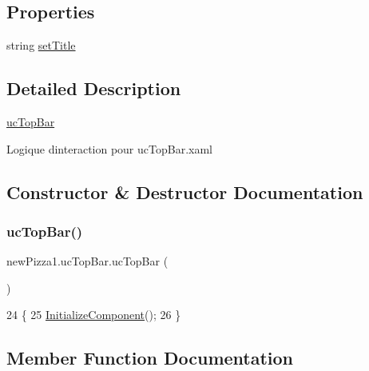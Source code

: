 \subsection*{Properties}
\begin{DoxyCompactItemize}
\item 
string \hyperlink{classnewPizza1_1_1ucTopBar_ad3df1844a240f0e6154fb426648f5260}{set\+Title}
\end{DoxyCompactItemize}


\subsection{Detailed Description}
\hyperlink{classnewPizza1_1_1ucTopBar}{uc\+Top\+Bar} 

Logique d\textquotesingle{}interaction pour uc\+Top\+Bar.\+xaml 

\subsection{Constructor \& Destructor Documentation}
\mbox{\label{classnewPizza1_1_1ucTopBar_a0b2a65964f1a91430b27927fac8568b8}} 
\subsubsection{\texorpdfstring{uc\+Top\+Bar()}{ucTopBar()}}
{\footnotesize\ttfamily new\+Pizza1.\+uc\+Top\+Bar.\+uc\+Top\+Bar (\begin{DoxyParamCaption}{ }\end{DoxyParamCaption})\hspace{0.3cm}{\ttfamily [inline]}}


\begin{DoxyCode}
24         \{
25             \hyperlink{classnewPizza1_1_1ucTopBar_a667aed93b177538819f27c62e5e88844}{InitializeComponent}();
26         \}
\end{DoxyCode}


\subsection{Member Function Documentation}
\mbox{\label{classnewPizza1_1_1ucTopBar_a667aed93b177538819f27c62e5e88844}} 
